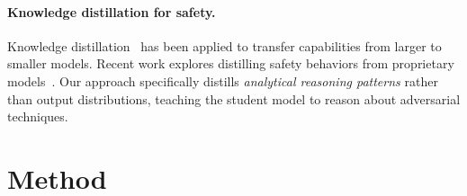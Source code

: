 \documentclass[11pt]{article}
\begin{document}
\paragraph{Knowledge distillation for safety.}
Knowledge distillation~\citep{hinton2015distilling} has been applied to transfer capabilities from larger to smaller models. Recent work explores distilling safety behaviors from proprietary models~\citep{tunstall2023zephyr}. Our approach specifically distills \emph{analytical reasoning patterns} rather than output distributions, teaching the student model to reason about adversarial techniques.

\section{Method}
\end{document}
